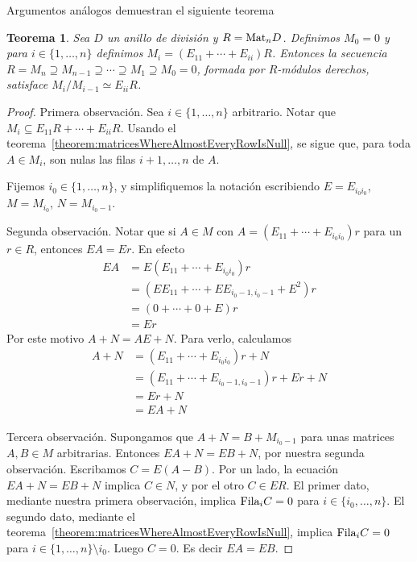 \documentclass{report}
\newcommand{\Mat}{\textnormal{Mat}}
\newcommand{\Fila}{\textnormal{Fila}}
\newtheorem{theorem}{Teorema}
\begin{document}
  Argumentos análogos demuestran el siguiente teorema
  \begin{theorem}\label{theorem:compositionSeriesOfRightModulesForMatrixRing}
    Sea \(D\) un anillo de división y \(R = \Mat_n D\).
    Definimos \(M_0 = 0\) y para \(i \in \{1, \dots, n\}\) definimos \(M_i = (E_{1 1} + \cdots + E_{i i}) R\).
    Entonces la secuencia \(R = M_n \supseteq M_{n - 1} \supseteq \cdots \supseteq M_1 \supseteq M_0 = 0\), formada por \(R\)-módulos derechos, satisface \(M_i / M_{i - 1} \simeq E_{i i} R\).
  \end{theorem}
  \begin{proof}
    Primera observación.
    Sea \(i \in \{1, \dots, n\}\) arbitrario.
    Notar que \(M_i \subseteq E_{1 1} R + \cdots + E_{i i} R\).
    Usando el teorema~\ref{theorem:matricesWhereAlmostEveryRowIsNull}, se sigue que, para toda \(A \in M_i\), son nulas las filas \(i + 1, \dots, n\) de \(A\).

    Fijemos \(i_0 \in \{1, \dots, n\}\), y simplifiquemos la notación escribiendo \(E = E_{i_0 i_0}\), \(M = M_{i_0}\), \(N = M_{i_0 - 1}\).

    Segunda observación.
    Notar que si \(A \in M\) con \(A = (E_{1 1} + \cdots + E_{i_0 i_0}) r\) para un \(r \in R\), entonces \(E A = E r\).
    En efecto
    \begin{align}
      E A
      &=
      E (E_{1 1} + \cdots + E_{i_0 i_0}) r
      \\
      &=
      (E E_{1 1} + \cdots + E E_{i_0 - 1, i_0 - 1} + E^2) r
      \\
      &=
      (0 + \cdots + 0 + E) r
      \\
      &=
      E r
    \end{align}
    Por este motivo \(A + N = A E + N\).
    Para verlo, calculamos
    \begin{align}
      A + N
      &=
      (E_{1 1} + \cdots + E_{i_0 i_0}) r + N
      \\
      &=
      (E_{1 1} + \cdots + E_{i_0 - 1, i_0 - 1}) r + E r + N
      \\
      &=
      E r + N
      \\
      &=
      E A + N
    \end{align}

    Tercera observación.
    Supongamos que \(A + N = B + M_{i_0 -1}\) para unas matrices \(A, B \in M\) arbitrarias.
    Entonces \(E A + N = E B + N\), por nuestra segunda observación.
    Escribamos \(C = E (A - B)\).
    Por un lado, la ecuación \(E A + N = E B + N\) implica \(C \in N\), y por el otro \(C \in E R\).
    El primer dato, mediante nuestra primera observación, implica \(\Fila_i C = 0\) para \(i \in \{i_0, \dots, n\}\).
    El segundo dato, mediante el teorema~\ref{theorem:matricesWhereAlmostEveryRowIsNull}, implica \(\Fila_i C = 0\) para \(i \in \{1, \dots, n\} \setminus i_0\).
    Luego \(C = 0\).
    Es decir \(E A = E B\).


\end{proof}
\end{document}
